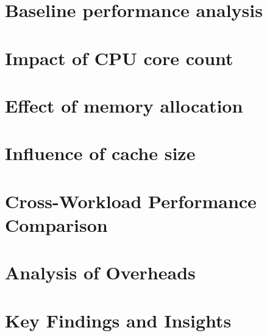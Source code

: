 \section{Baseline performance analysis}

\section{Impact of CPU core count}

\section{Effect of memory allocation}

\section{Influence of cache size}

\section{Cross-Workload Performance Comparison}

\section{Analysis of Overheads}

\section{Key Findings and Insights}